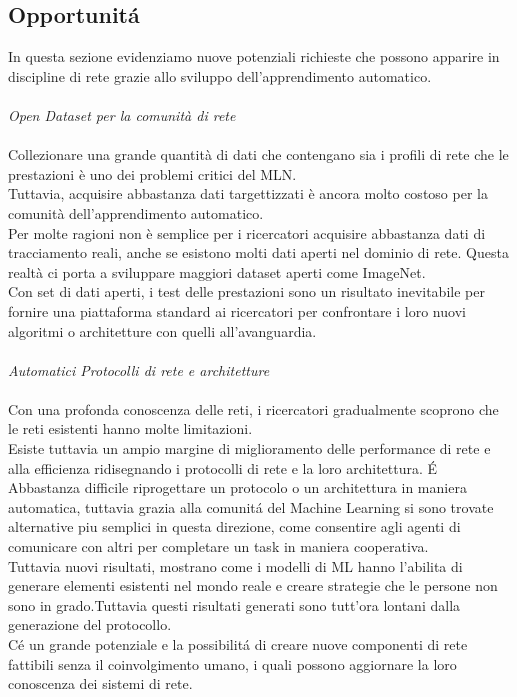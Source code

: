 \documentclass[../tesi.tex]{subfiles}
\begin{document}
\subsection{Opportunitá}
In questa sezione evidenziamo nuove potenziali richieste che possono apparire in discipline di rete grazie allo sviluppo dell’apprendimento automatico.\\
\\
\textit{Open Dataset per la comunità di rete}\\
\\
Collezionare una grande quantità di dati che contengano sia i profili di rete che le prestazioni è uno dei problemi critici del MLN.\\
Tuttavia, acquisire abbastanza dati targettizzati è ancora molto costoso per la comunità dell’apprendimento automatico.\\
Per molte ragioni non è semplice per i ricercatori acquisire abbastanza dati di tracciamento reali, anche se esistono molti dati aperti nel dominio di rete.
Questa realtà ci porta a sviluppare maggiori dataset aperti come ImageNet.\\
Con set di dati aperti, i test delle prestazioni sono un risultato inevitabile per fornire una piattaforma standard ai ricercatori per confrontare i loro nuovi algoritmi o architetture con quelli all’avanguardia.\\
\\
\textit{Automatici Protocolli di rete e architetture}\\
\\
Con una profonda conoscenza delle reti, i ricercatori gradualmente scoprono che le reti esistenti hanno molte limitazioni.\\
Esiste tuttavia un ampio margine di miglioramento delle performance di rete e alla efficienza ridisegnando i protocolli di rete e la loro architettura. É Abbastanza difficile riprogettare un protocolo o un architettura in maniera automatica, tuttavia grazia alla comunitá del Machine Learning si sono trovate alternative piu semplici in questa direzione, come consentire agli agenti di comunicare con altri per completare un task in maniera cooperativa.\\
Tuttavia nuovi risultati, mostrano come i modelli di ML hanno l’abilita di generare elementi esistenti nel mondo reale e creare strategie che le persone non sono in grado.Tuttavia questi risultati generati sono tutt’ora lontani dalla generazione del protocollo.\\
Cé un grande potenziale e la possibilitá di creare nuove componenti di rete fattibili senza il coinvolgimento umano, i quali possono aggiornare la loro conoscenza dei sistemi di rete.\\
\end{document}
